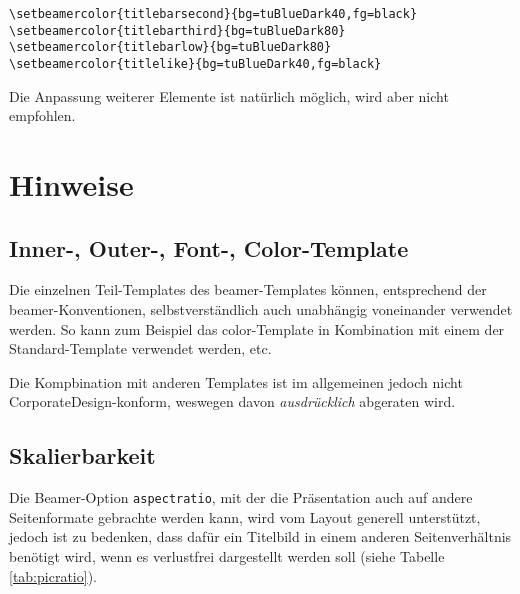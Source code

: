 \example

\begin{lstlisting}
\setbeamercolor{titlebarsecond}{bg=tuBlueDark40,fg=black}
\setbeamercolor{titlebarthird}{bg=tuBlueDark80}
\setbeamercolor{titlebarlow}{bg=tuBlueDark80}
\setbeamercolor{titlelike}{bg=tuBlueDark40,fg=black}
\end{lstlisting}

Die Anpassung weiterer Elemente ist natürlich möglich,
wird aber nicht empfohlen.

% 
% 

\section{Hinweise}

\subsection{Inner-, Outer-, Font-, Color-Template}

Die einzelnen Teil-Templates des beamer-Templates können,
entsprechend der beamer-Konventionen, selbstverständlich
auch unabhängig voneinander verwendet werden.
So kann zum Beispiel das color-Template in Kombination mit einem der
Standard-Template verwendet werden, etc.

Die Kompbination mit anderen Templates ist im allgemeinen jedoch nicht
CorporateDesign-konform, weswegen davon \emph{ausdrücklich} abgeraten wird.

\subsection{Skalierbarkeit}

Die Beamer-Option \lstinline{aspectratio}, mit der die Präsentation auch auf
andere Seitenformate gebrachte werden kann, wird vom Layout generell
unterstützt, jedoch ist zu bedenken, dass dafür ein Titelbild in einem anderen
Seitenverhältnis benötigt wird, wenn es verlustfrei dargestellt werden soll
(siehe Tabelle \ref{tab:picratio}).

